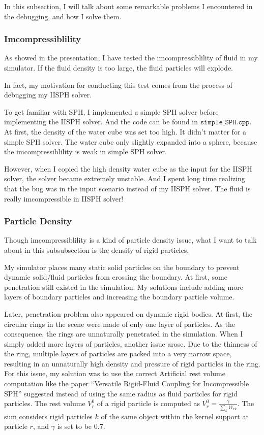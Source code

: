 \documentclass[acmlarge]{acmart}
\begin{document}
In this subsection, I will talk about some remarkable problems I encountered in the debugging, and how I solve them.

\subsubsection{Imcompressiblility}

As showed in the presentation, I have tested the imcompressiblility of fluid in my simulator.
If the fluid density is too large, the fluid particles will explode.

In fact, my motivation for conducting this test comes from the process of debugging my IISPH solver.

To get familiar with SPH, I implemented a simple SPH solver before implementing the IISPH solver. And the code 
can be found in $\texttt{simple\_SPH.cpp}$.
At first, the density of the water cube was set too high. It didn't matter for a simple SPH solver.
The water cube only slightly expanded into a sphere, because the imcompressiblility is weak in simple SPH solver.

However, when I copied the high density water cube as the input for the IISPH solver, the solver became extremely unstable. And I spent long
time realizing that the bug was in the input scenario instead of my IISPH solver. The fluid is really imcompressible in IISPH solver!

\subsubsection{Particle Density}

Though imcompressiblility is a kind of particle density issue, what I want to talk about in this subsubsection is the density of rigid particles.

My simulator places many static solid particles on the boundary to prevent dynamic solid/fluid particles from crossing the boundary.
At first, some penetration still existed in the simulation. My solutions include adding more layers of boundary particles and increasing the 
boundary particle volume.

Later, penetration problem also appeared on dynamic rigid bodies. At first, the circular rings in the scene were made of only one layer of particles.
As the consequence, the rings are unnaturally penetrated in the simulation. 
When I simply added more layers of particles, another issue arose. 
Due to the thinness of the ring, multiple layers of particles are packed into a very narrow space, 
resulting in an unnaturally high density and pressure of rigid particles in the ring. 
For this issue, my solution was to use the correct Artificial rest volume computation 
like the paper ``Versatile Rigid-Fluid Coupling for Incompressible SPH''\cite{AK2012} suggested
instead of using the same radius as fluid particles for rigid particles.
The rest volume $V_r^0$ of a rigid particle is
computed as $V_r^0=\frac{\gamma}{\sum_k W_{rk}} $. The sum considers rigid particles $k$
of the same object within the kernel support at particle $r$, and $\gamma$ is set to be $0.7$.
\end{document}
